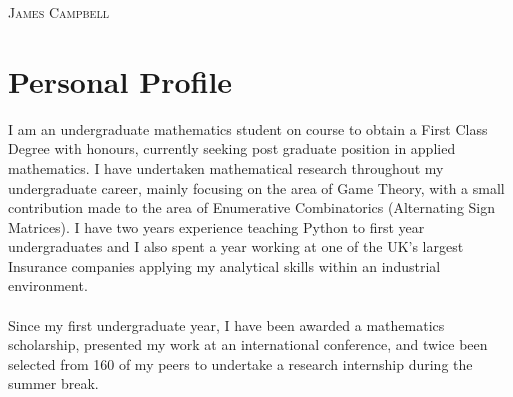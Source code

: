\documentclass[a4paper]{article}
\begin{document}
\pagestyle{empty} %
\begin{multicols}{2}

\raggedright{\textsc{\Huge{James Campbell}}}\\
\columnbreak
{}

\end{multicols}

\section{Personal Profile}
I am an undergraduate mathematics student on course to obtain a First Class Degree with honours, currently seeking post graduate position in applied mathematics.
I have undertaken mathematical research throughout my undergraduate career, mainly focusing on the area of Game Theory, with a small contribution made to the area of Enumerative Combinatorics (Alternating Sign Matrices).
I have two years experience teaching Python to first year undergraduates and I also spent a year working at one of the UK's largest Insurance companies applying my analytical skills within an industrial environment.\\
\\
Since my first undergraduate year, I have been awarded a mathematics scholarship, presented my work at an international conference, and twice been selected from 160 of my peers to undertake a research internship during the summer break.

\end{document}
